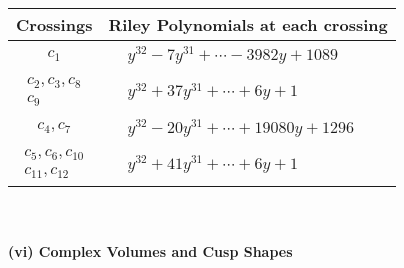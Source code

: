 \documentclass[1p]{elsarticle_modified}
\theoremstyle{definition}
\begin{document}
\begin{tabular}{m{50pt}|m{274pt}}
Crossings & \hspace{64pt}Riley Polynomials at each crossing \\
\hline $$\begin{aligned}c_{1}\end{aligned}$$&$\begin{aligned}
&y^{32}-7 y^{31}+\cdots-3982 y+1089
\end{aligned}$\\
\hline $$\begin{aligned}c_{2},c_{3},c_{8}\\c_{9}\end{aligned}$$&$\begin{aligned}
&y^{32}+37 y^{31}+\cdots+6 y+1
\end{aligned}$\\
\hline $$\begin{aligned}c_{4},c_{7}\end{aligned}$$&$\begin{aligned}
&y^{32}-20 y^{31}+\cdots+19080 y+1296
\end{aligned}$\\
\hline $$\begin{aligned}c_{5},c_{6},c_{10}\\c_{11},c_{12}\end{aligned}$$&$\begin{aligned}
&y^{32}+41 y^{31}+\cdots+6 y+1
\end{aligned}$\\
\hline
\end{tabular}\\~\\
\newpage\flushleft \textbf{(vi) Complex Volumes and Cusp Shapes}
\end{document}
